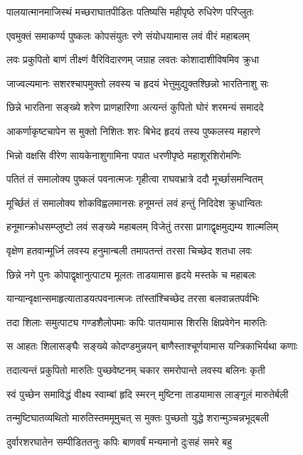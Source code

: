 \twolineshloka
{पालयात्मानमाजिस्थं मच्छराघातपीडितः}
{पतिष्यसि महीपृष्ठे रुधिरेण परिप्लुतः}%

\twolineshloka
{एवमुक्तं समाकर्ण्य पुष्कलः कोपसंयुतः}
{रणे संयोधयामास लवं वीरं महाबलम्}%

\twolineshloka
{लवः प्रकुपितो बाणं तीक्ष्णं वैरिविदारणम्}
{जग्राह लवतः कोशादाशीविषमिव क्रुधा}%

\twolineshloka
{जाज्वल्यमानः सशरश्चापमुक्तो लवस्य च}
{हृदयं भेत्तुमुद्युक्तश्छिन्नो भारतिनाशु सः}%

\twolineshloka
{छिन्ने भारतिना सङ्ख्ये शरेण प्राणहारिणा}
{अत्यन्तं कुपितो घोरं शरमन्यं समाददे}%

\twolineshloka
{आकर्णाकृष्टचापेन स मुक्तो निशितः शरः}
{बिभेद हृदयं तस्य पुष्कलस्य महारणे}%

\twolineshloka
{भिन्नो वक्षसि वीरेण सायकेनाशुगामिना}
{पपात धरणीपृष्ठे महाशूरशिरोमणिः}%

\twolineshloka
{पतितं तं समालोक्य पुष्कलं पवनात्मजः}
{गृहीत्वा राघवभ्रात्रे ददौ मूर्च्छासमन्वितम्}%

\twolineshloka
{मूर्च्छितं तं समालोक्य शोकविह्वलमानसः}
{हनूमन्तं लवं हन्तुं निदिदेश क्रुधान्वितः}%

\twolineshloka
{हनूमान्क्रोधसम्प्लुष्टो लवं सङ्ख्ये महाबलम्}
{विजेतुं तरसा प्रागाद्वृक्षमुद्यम्य शाल्मलिम्}%

\twolineshloka
{वृक्षेण हतवान्मूर्ध्नि लवस्य हनुमान्बली}
{तमापतन्तं तरसा चिच्छेद शतधा लवः}%

\twolineshloka
{छिन्ने नगे पुनः कोपाद्वृक्षानुत्पाट्य मूलतः}
{ताडयामास हृदये मस्तके च महाबलः}%

\twolineshloka
{यान्यान्वृक्षान्समाहृत्याताडयत्पवनात्मजः}
{तांस्तांश्चिच्छेद तरसा बलवान्नतपर्वभिः}%

\twolineshloka
{तदा शिलाः समुत्पाट्य गण्डशैलोपमाः कपिः}
{पातयामास शिरसि क्षिप्रवेगेन मारुतिः}%

\twolineshloka
{स आहतः शिलासङ्घैः सङ्ख्ये कोदण्डमुन्नयन्}
{बाणैस्ताश्चूर्णयामास यन्त्रिकाभिर्यथा कणाः}%

\twolineshloka
{तदात्यन्तं प्रकुपितो मारुतिः पुच्छवेष्टनम्}
{चकार समरोपान्ते लवस्य बलिनः कृती}%

\twolineshloka
{स्वं पुच्छेन समाविद्धं वीक्ष्य स्वाम्बां हृदि स्मरन्}
{मुष्टिना ताडयामास लाङ्गूलं मारुतेर्बली}%

\twolineshloka
{तन्मुष्टिघातव्यथितो मारुतिस्तममूमुचत्}
{स मुक्तः पुच्छतो युद्धे शरान्मुञ्चन्नभूद्बली}%

\twolineshloka
{दुर्वारशरघातेन सम्पीडिततनुः कपिः}
{बाणवर्षं मन्यमानो दुःसहं समरे बहु}%

